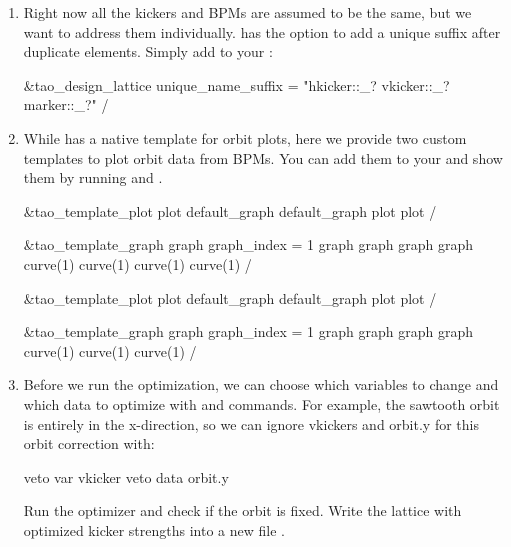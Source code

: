 \documentclass{hitec}     %
\begin{document}
{{{{\begin{enumerate}[leftmargin=*]
\begin{code}
&tao_var
	v1_var%
	search_for_lat_eles = 'vkicker::*'
	default_step = 1e-6
	default_attribute = 'kick'
/
\end{code}
\item Right now all the kickers and BPMs are assumed to be the same, but we want to address them individually. \tao has the option to add a unique suffix after duplicate elements. Simply add to your :
\begin{code}
&tao_design_lattice
	unique_name_suffix = "hkicker::_? vkicker::_? marker::_?"
/
\end{code}
\item While \tao has a native template for orbit plots, here we provide two custom templates to plot orbit data from BPMs. You can add them to your  and show them by running  and .
\begin{code}
&tao_template_plot
  plot%
  default_graph%
  default_graph%
  plot%
  plot%
/

&tao_template_graph
  graph%
  graph_index = 1
  graph%
  graph%
  graph%
  graph%
  curve(1)%
  curve(1)%
  curve(1)%
  curve(1)%
/

&tao_template_plot
  plot%
  default_graph%
  default_graph%
  plot%
  plot%
/

&tao_template_graph
  graph%
  graph_index = 1
  graph%
  graph%
  graph%
  graph%
  curve(1)%
  curve(1)%
  curve(1)%
/
\end{code}
\item Before we run the optimization, we can choose which variables to change and which data to optimize with  and  commands. For example, the sawtooth orbit is entirely in the x-direction, so we can ignore vkickers and orbit.y for this orbit correction with:
\begin{code}
veto var vkicker
veto data orbit.y
\end{code}
Run the optimizer and check if the orbit is fixed. Write the lattice with optimized kicker strengths into a new file .
\end{enumerate}

}}}}
\end{document}
